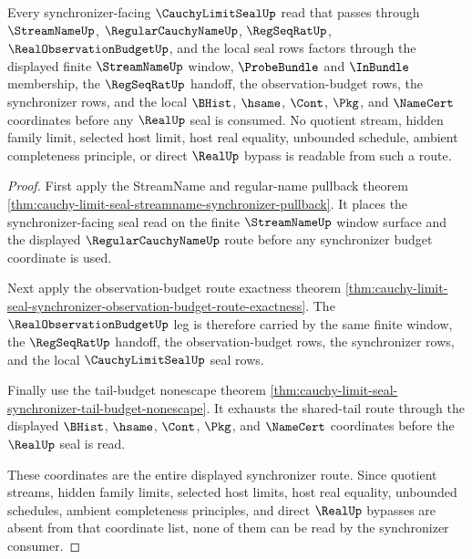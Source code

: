 \begin{theorem}
\label{thm:cauchy-limit-seal-synchronizer-finite-window-nonescape}
Every synchronizer-facing $\CauchyLimitSealUp$ read that passes through $\StreamNameUp$, $\RegularCauchyNameUp$, $\RegSeqRatUp$, $\RealObservationBudgetUp$, and the local seal rows factors through the displayed finite $\StreamNameUp$ window, $\ProbeBundle$ and $\InBundle$ membership, the $\RegSeqRatUp$ handoff, the observation-budget rows, the synchronizer rows, and the local $\BHist$, $\hsame$, $\Cont$, $\Pkg$, and $\NameCert$ coordinates before any $\RealUp$ seal is consumed. No quotient stream, hidden family limit, selected host limit, host real equality, unbounded schedule, ambient completeness principle, or direct $\RealUp$ bypass is readable from such a route.
\end{theorem}
\begin{proof}
First apply the StreamName and regular-name pullback theorem \autoref{thm:cauchy-limit-seal-streamname-synchronizer-pullback}. It places the synchronizer-facing seal read on the finite $\StreamNameUp$ window surface and the displayed $\RegularCauchyNameUp$ route before any synchronizer budget coordinate is used.

Next apply the observation-budget route exactness theorem \autoref{thm:cauchy-limit-seal-synchronizer-observation-budget-route-exactness}. The $\RealObservationBudgetUp$ leg is therefore carried by the same finite window, the $\RegSeqRatUp$ handoff, the observation-budget rows, the synchronizer rows, and the local $\CauchyLimitSealUp$ seal rows.

Finally use the tail-budget nonescape theorem \autoref{thm:cauchy-limit-seal-synchronizer-tail-budget-nonescape}. It exhausts the shared-tail route through the displayed $\BHist$, $\hsame$, $\Cont$, $\Pkg$, and $\NameCert$ coordinates before the $\RealUp$ seal is read.

These coordinates are the entire displayed synchronizer route. Since quotient streams, hidden family limits, selected host limits, host real equality, unbounded schedules, ambient completeness principles, and direct $\RealUp$ bypasses are absent from that coordinate list, none of them can be read by the synchronizer consumer.
\end{proof}

